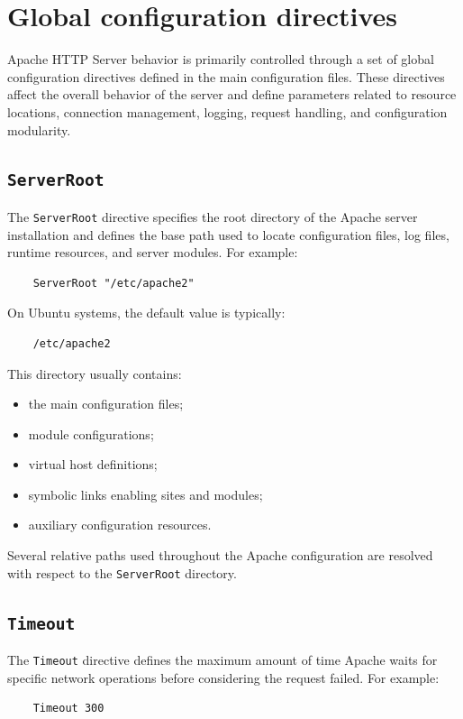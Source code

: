 \documentclass{scrbook}
\begin{document}
	\section{Global configuration directives}
	
	Apache HTTP Server behavior is primarily controlled through a set of global configuration directives defined in the main configuration files. These directives affect the overall behavior of the server and define parameters related to resource locations, connection management, logging, request handling, and configuration modularity.
	
	\subsection{\texttt{ServerRoot}}
	
	The \texttt{ServerRoot} directive specifies the root directory of the Apache server installation and defines the base path used to locate configuration files, log files, runtime resources, and server modules. For example:
	
	\begin{lstlisting}
	ServerRoot "/etc/apache2"
	\end{lstlisting}
	
	On Ubuntu systems, the default value is typically:
	
	\begin{lstlisting}
	/etc/apache2
	\end{lstlisting}
	
	This directory usually contains:
	\begin{itemize}
		\item the main configuration files;
		\item module configurations;
		\item virtual host definitions;
		\item symbolic links enabling sites and modules;
		\item auxiliary configuration resources.
	\end{itemize}
	
	Several relative paths used throughout the Apache configuration are resolved with respect to the \texttt{ServerRoot} directory.
	
	\subsection{\texttt{Timeout}}
	
	The \texttt{Timeout} directive defines the maximum amount of time Apache waits for specific network operations before considering the request failed. For example:
	\begin{lstlisting}
	Timeout 300
	\end{lstlisting}
	
\end{document}
